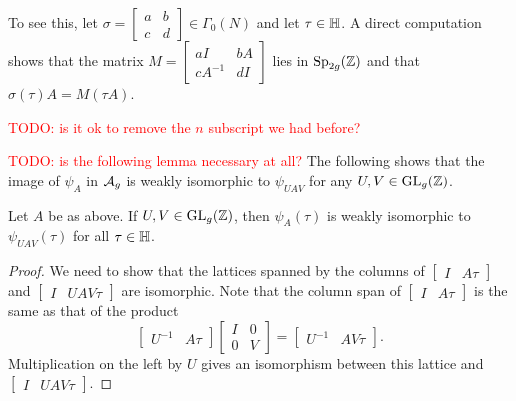 \documentclass{amsart}
\begin{document}
To see this, let $\sigma = \begin{bmatrix} a & b \\ c & d \end{bmatrix} \in \Gamma_0(N)$ and let $\tau \in \mathbb{H}$. A direct computation shows that the matrix $M = \begin{bmatrix} aI & bA \\ cA^{-1} & dI \end{bmatrix}$ lies in $\operatorname{Sp}_{2g}(\mathbb{Z})$
and that $\sigma(\tau)A = M(\tau A)$.

\textcolor{red}{TODO: is it ok to remove the $n$ subscript we had before?}

\textcolor{red}{TODO: is the following lemma necessary at all?}
The following shows that the image of $\psi_A$ in $\mathcal{A}_g$ is weakly isomorphic to $\psi_{UAV}$ for any $U,V \in \operatorname{GL}_g(\mathbb{Z})$.

\begin{lemma}\label{lem:A-UAV-weakly-isom}
  Let $A$ be as above. If $U,V \in \operatorname{GL}_g(\mathbb{Z})$, then $\psi_{A}(\tau)$ is weakly isomorphic to $\psi_{UAV}(\tau)$ for all $\tau \in \mathbb{H}$.
\end{lemma}
\begin{proof}
  We need to show that the lattices spanned by the columns of $\begin{bmatrix} I & A\tau \end{bmatrix}$ and $\begin{bmatrix} I & UAV\tau \end{bmatrix}$ are isomorphic. Note that the column span of $\begin{bmatrix} I & A\tau \end{bmatrix}$ is the same as that of the product
  \[
    \begin{bmatrix} U^{-1} & A\tau \end{bmatrix}\begin{bmatrix} I & 0 \\ 0 & V \end{bmatrix}
    =
    \begin{bmatrix} U^{-1} & AV\tau \end{bmatrix}.
  \]
  Multiplication on the left by $U$ gives an isomorphism between this lattice and $\begin{bmatrix} I & UAV\tau \end{bmatrix}$.
\end{proof}
\end{document}
